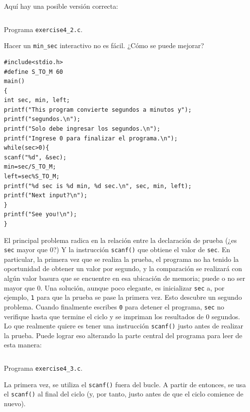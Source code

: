 \documentclass[spanish,addpoints,answers,a4paper]{exam}
\begin{document}
\begin{questions}
\begin{solution}
Aquí hay una posible versión correcta:

\begin{listing}[H]
	\footnotesize
	\inputminted{c}{exercise4_2.c}
	\caption{Programa \texttt{exercise4\_2.c}.}
	\label{lst:4.2}
\end{listing}
\end{solution}

\question Hacer un \texttt{min_sec} interactivo no es fácil. ¿Cómo se puede mejorar?

\begin{verbatim}
#include<stdio.h>
#define S_TO_M 60
main()
{
int sec, min, left;
printf("This program convierte segundos a minutos y");
printf("segundos.\n");
printf("Solo debe ingresar los segundos.\n");
printf("Ingrese 0 para finalizar el programa.\n");
while(sec>0){
scanf("%d", &sec);
min=sec/S_TO_M;
left=sec%S_TO_M;
printf("%d sec is %d min, %d sec.\n", sec, min, left);
printf("Next input?\n");
}
printf("See you!\n");
}
\end{verbatim}

\begin{solution}

El principal problema radica en la relación entre la declaración de prueba (¿es \texttt{sec} mayor que $0$?) Y la instrucción \texttt{scanf()} que obtiene el valor de \texttt{sec}. En particular, la primera vez que se realiza la prueba, el programa no ha tenido la oportunidad de obtener un valor por segundo, y la comparación se realizará con algún valor basura que se encuentre en esa ubicación de memoria; puede o no ser mayor que $0$. Una solución, aunque poco elegante, es inicializar \texttt{sec} a, por ejemplo, \texttt{1} para que la prueba se pase la primera vez. Esto descubre un segundo problema. Cuando finalmente escribes \texttt{0} para detener el programa, \texttt{sec} no
verifique hasta que termine el ciclo y se impriman los resultados de $0$ segundos. Lo que realmente quiere es tener una instrucción \texttt{scanf()} justo antes de realizar la prueba. Puede lograr eso alterando la parte central del programa para leer de esta manera:

\begin{listing}[H]
	\footnotesize
	\inputminted{c}{exercise4_3.c}
	\caption{Programa \texttt{exercise4\_3.c}.}
	\label{lst:4.3}
\end{listing}

La primera vez, se utiliza el \texttt{scanf()} fuera del bucle. A partir de entonces, se usa el \texttt{scanf()} al final del ciclo (y, por tanto, justo antes de que el ciclo comience de nuevo).
\end{solution}


\end{questions}
\end{document}
